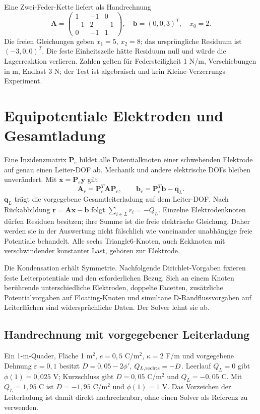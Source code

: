 Eine Zwei-Feder-Kette liefert als Handrechnung
\begin{equation}\label{eq:spring-example}
\mathbf A=\begin{pmatrix}1&-1&0\\-1&2&-1\\0&-1&1\end{pmatrix},
\quad\mathbf b=(0,0,3)^T,\quad x_0=2.
\end{equation}
Die freien Gleichungen geben $x_1=5$, $x_2=8$; das ursprüngliche Residuum
ist $(-3,0,0)^T$. Die feste Einheitszeile hätte Residuum null und würde die
Lagerreaktion verlieren. Zahlen gelten für Federsteifigkeit 1 N/m,
Verschiebungen in m, Endlast 3 N; der Test ist algebraisch und kein
Kleine-Verzerrungs-Experiment.

\section{Equipotentiale Elektroden und Gesamtladung}
Eine Inzidenzmatrix $\mathbf P_e$ bildet alle Potentialknoten einer schwebenden
Elektrode auf genau einen Leiter-DOF ab. Mechanik und andere elektrische
DOFs bleiben unverändert. Mit $\mathbf x=\mathbf P_e\mathbf y$ gilt
\begin{equation}\label{eq:electrode-condensation}
\mathbf A_r=\mathbf P_e^T\mathbf A\mathbf P_e,\qquad
\mathbf b_r=\mathbf P_e^T\mathbf b-\mathbf q_L.
\end{equation}
$\mathbf q_L$ trägt die vorgegebene Gesamtleiterladung auf dem Leiter-DOF.
Nach Rückabbildung $\mathbf r=\mathbf A\mathbf x-\mathbf b$ folgt
$\sum_{i\in L}r_i=-Q_L$. Einzelne Elektrodenknoten dürfen Residuen besitzen;
ihre Summe ist die freie elektrische Gleichung. Daher werden sie in der
Auswertung nicht fälschlich wie voneinander unabhängige freie Potentiale
behandelt. Alle sechs Triangle6-Knoten, auch Eckknoten mit verschwindender
konstanter Last, gehören zur Elektrode.

Die Kondensation erhält Symmetrie. Nachfolgende Dirichlet-Vorgaben fixieren
feste Leiterpotentiale und den erforderlichen Bezug. Sich an einem Knoten
berührende unterschiedliche Elektroden, doppelte Facetten, zusätzliche
Potentialvorgaben auf Floating-Knoten und simultane D-Randflussvorgaben auf
Leiterflächen sind widersprüchliche Daten. Der Solver lehnt sie ab.

\subsection{Handrechnung mit vorgegebener Leiterladung}
Ein 1-m-Quader, Fläche 1 m$^2$, $e=0{,}5$ C/m$^2$, $\kappa=2$ F/m und
vorgegebene Dehnung $\varepsilon=0{,}1$ besitzt
$D=0{,}05-2\phi'$, $Q_{L,\rm rechts}=-D$.
Leerlauf $Q_L=0$ gibt $\phi(1)=0{,}025$ V; Kurzschluss gibt $D=0{,}05$
C/m$^2$ und $Q_L=-0{,}05$ C. Mit $Q_L=1{,}95$ C ist
$D=-1{,}95$ C/m$^2$ und $\phi(1)=1$ V. Das Vorzeichen der Leiterladung
ist damit direkt nachrechenbar, ohne einen Solver als Referenz zu verwenden.

